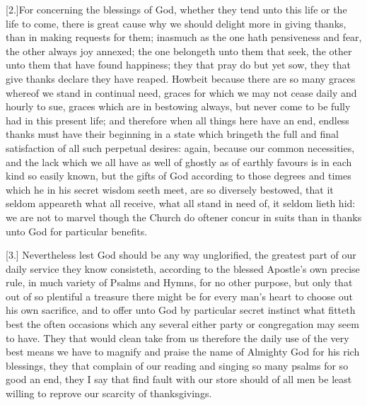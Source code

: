 [2.]For concerning the blessings of God, whether they tend unto this life or the life to come, there is great cause why we should delight more in giving thanks, than in making requests for them; inasmuch as the one hath pensiveness and fear, the other always joy annexed; the one belongeth unto them that seek, the other unto them that have found happiness; they that pray do but yet sow, they that give thanks declare they have reaped. Howbeit because there are so many graces whereof we stand in continual need, graces for which we may not cease daily and hourly to sue, graces which are in bestowing always, but never come to be fully had in this present life; and therefore when all things here have an end, endless thanks must have their beginning in a state which bringeth the full and final satisfaction of all such perpetual desires: again, because our common necessities, and the lack which we all have as well of ghostly as of earthly favours is in each kind so easily known, but the gifts of God according to those degrees and times which he in his secret wisdom seeth meet, are so diversely bestowed, that it seldom appeareth what all receive, what all stand in need of, it seldom lieth hid: we are not to marvel though the Church do oftener concur in suits than in thanks unto God for particular benefits.




[3.] Nevertheless lest God should be any way unglorified, the greatest part of our daily service they know consisteth, according to the blessed Apostle’s own precise rule, in much variety of Psalms and Hymns, for no other purpose, but only that out of so plentiful a treasure there might be for every man’s heart to choose out his own sacrifice, and to offer unto God by particular secret instinct what fitteth best the often occasions which any several either party or congregation may seem to have. They that would clean take from us therefore the daily use of the very best means we have to magnify and praise the name of Almighty God for his rich blessings, they that complain of our reading and singing so many psalms for so good an end, they I say that find fault with our store should of all men be least willing to reprove our scarcity of thanksgivings.

